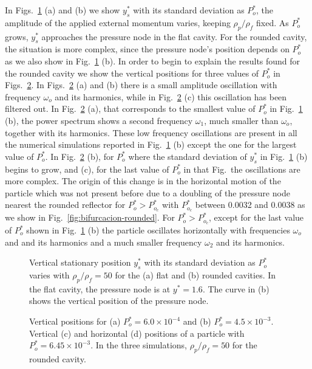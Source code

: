 In Figs.~\ref{fig:barrido-momento} (a) and (b) we show $y_s^\ast$ with its standard 
deviation as $P_o^\ast$, the amplitude of the applied external momentum varies, 
keeping $\rho_p/\rho_f$ fixed. As $P_o^\ast$ grows, $y_s^\ast$ approaches the pressure 
node in the flat cavity. For the rounded cavity, the situation is more complex, since 
the pressure node's position depends on $P_o^\ast$ as we also show in 
Fig.~\ref{fig:barrido-momento} (b). In order to begin to explain the results found for 
the rounded cavity we show the vertical positions for three values of $P_o^\ast$ in 
Figs.~\ref{fig:paths-rho-30-rounded}. In Figs.~\ref{fig:paths-rho-30-rounded} (a) and (b) 
there is a small amplitude oscillation with frequency $\omega_o$ and its harmonics, while 
in Fig.~\ref{fig:paths-rho-30-rounded} (c) this oscillation has been filtered out. In 
Fig.~\ref{fig:paths-rho-30-rounded} (a), that corresponds to the smallest value of 
$P_o^\ast$ in Fig.~\ref{fig:barrido-momento} (b), the power spectrum shows a second
frequency $\omega_1$, much smaller than $\omega_o$, together with its harmonics.
These low frequency oscillations are present in all the numerical simulations reported
in Fig.~\ref{fig:barrido-momento} (b) except the one for the largest value of $P_o^\ast$.
In Fig.~\ref{fig:paths-rho-30-rounded} (b), for $P_o^\ast$ where the standard deviation 
of $y_s^\ast$ in Fig.~\ref{fig:barrido-momento} (b) begins to grow, and (c), for the last 
value of $P_o^\ast$ in that Fig.~the oscillations  are more complex. The origin of this 
change is in the horizontal motion of the particle which was not present before due to a 
doubling of the pressure node nearest the rounded reflector for $P_o^\ast>P_{o_c}^\ast$ 
with $P_{o_c}^\ast$ between 0.0032 and 0.0038 as we show in 
Fig.~\ref{fig:bifurcacion-rounded}. For $P_o^\ast>P_{o_c}^\ast$, except for the last
value of $P_o^\ast$ shown in Fig.~\ref{fig:barrido-momento} (b) the particle oscillates
horizontally with frequencies $\omega_o$ and and its harmonics and a much smaller
frequency $\omega_2$ and its harmonics.
%
\begin{figure}


\caption{\label{fig:barrido-momento}
 Vertical stationary position $y_s^\ast$ with its standard deviation as 
 $P_o^\ast$ varies with $\rho_p/\rho_f=50$ for the (a) flat and (b) rounded 
 cavities. In the flat cavity, the pressure node is at $y^\ast=1.6$. The curve in (b) 
 shows the vertical position of the pressure node.
}
\end{figure}
%
\begin{figure}




\caption{\label{fig:paths-rho-30-rounded}
 Vertical positions for (a) $P_o^\ast = 6.0\times 10^{-4}$ and (b) 
 $P_o^\ast = 4.5\times 10^{-3}$. Vertical (c) and horizontal (d) positions of a particle 
 with $P_o^\ast = 6.45\times 10^{-3}$. In the three simulations, $\rho_p/\rho_f=50$ for 
 the rounded cavity.}
\end{figure}

